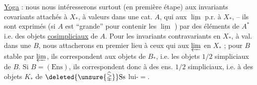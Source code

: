 \uline{Yoga} : nous nous intéresserons surtout  (en première étape) aux invariants covariants attachés à $X_*$, à valeurs dans une cat. $A$, qui   aux $\underline{\lim}$ p.r. à $X_*$, -- ils sont  exprimés (si $A$ est ``grande'' pour contenir les $\underline{\lim}$ ) par des éléments de $A^*$ i.e. des objets \uline{cosimpliciaux} de $A$. Pour les invariants contravariants en $X_*$, à val. dans une $B$,  nous attacherons en premier lieu à ceux qui  aux $\varprojlim$ en $X_*$ ; pour $B$ stable par $\varprojlim$, ils correspondent  aux objets de $B_*$, i.e. les objets $1/2$ simpliciaux de $B$. Si $B=(\mathrm{Ens})$, ils correspondent donc à des ens. $1/2$ simpliciaux, i.e. à des objets $K_*$ de $\deleted{\unsure{\widehat{\mathbb{\Delta}}}}\mathrm{Ss}$ lui-$=$.
